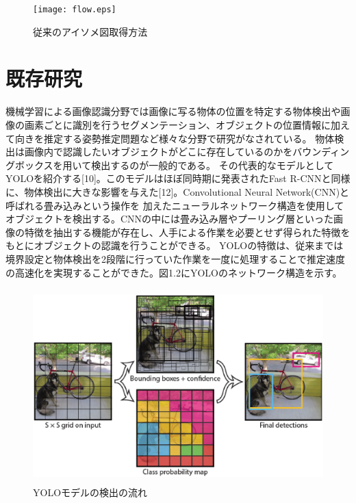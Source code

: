 \begin{figure}[htbt]
	\centering
	 \texttt{[image: flow.eps]}
	 \caption{従来のアイソメ図取得方法}
	 \label{fig:f2}
\end{figure}

\section{既存研究}
機械学習による画像認識分野では画像に写る物体の位置を特定する物体検出や画像の画素ごとに識別を行うセグメンテーション、オブジェクトの位置情報に加えて向きを推定する姿勢推定問題など様々な分野で研究がなされている。
物体検出は画像内で認識したいオブジェクトがどこに存在しているのかをバウンディングボックスを用いて検出するのが一般的である。
その代表的なモデルとしてYOLOを紹介する[10]。このモデルはほぼ同時期に発表されたFast R-CNNと同様に、物体検出に大きな影響を与えた[12]。Convolutional Neural Network(CNN)と呼ばれる畳み込みという操作を
加えたニューラルネットワーク構造を使用してオブジェクトを検出する。CNNの中には畳み込み層やプーリング層といった画像の特徴を抽出する機能が存在し、人手による作業を必要とせず得られた特徴をもとにオブジェクトの認識を行うことができる。
YOLOの特徴は、従来までは境界設定と物体検出を2段階に行っていた作業を一度に処理することで推定速度の高速化を実現することができた。図1.2にYOLOのネットワーク構造を示す。\\
\begin{figure}[htbt]
	\centering
	 \includegraphics[height=75mm]{yolo.eps}
	 \caption{YOLOモデルの検出の流れ}
	 \label{fig:f2}
\end{figure}

